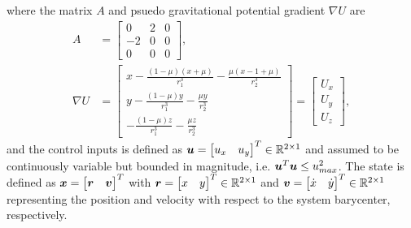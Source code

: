 \documentclass[smallcondensed]{svjour3}
\begin{document}
where the matrix \( A \) and psuedo gravitational potential gradient \( \nabla U\) are
\begin{align}
    A &= \left[ \begin{array}{ccc} 0 & 2 & 0 \\ -2 & 0 & 0 \\ 0 & 0 & 0 \end{array} \right], \label{eq:A_mat} \\
    \nabla U &= \left[ \begin{array}{c} x - \frac{ \left(1 - \mu\right) \left(x + \mu\right)}{r_1^3} - \frac{\mu \left( x - 1 + \mu \right)}{r_2^3} \\
                                                                                        y - \frac{ \left(1 - \mu\right) y}{r_1^3} - \frac{\mu y}{r_2^3} \\
                                                                                        - \frac{ \left(1 - \mu\right) z}{r_1^3} - \frac{\mu z}{r_2^3}\end{array}\right]
                                        = \left[\begin{array}{c} U_x \\ U_y \\ U_z\end{array} \right] , \label{eq:grav_pot}
\end{align}
and the control inputs is defined as \( \bm{u} = \begin{bmatrix} u_x & u_y \end{bmatrix}^T \in \mathbb{R}^{2\times1} \) and assumed to be continuously variable but bounded in magnitude, i.e. \( \bm{u}^T \bm{u} \leq u_{max}^2 \).
The state is defined as \( \bm{x} = \begin{bmatrix}\bm{r} &\bm{v} \end{bmatrix}^T\) with \(\bm{r} = \begin{bmatrix} x & y \end{bmatrix}^T \in \mathbb{R}^{2\times1}\) and \(\bm{v}= \begin{bmatrix} \dot{x} & \dot{y} \end{bmatrix}^T \in \mathbb{R}^{2\times1}\) representing the position and velocity with respect to the system barycenter, respectively.
\end{document}
